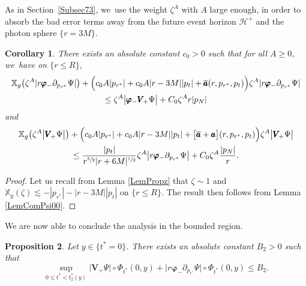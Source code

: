 \documentclass[10pt]{amsart}
\theoremstyle{plain}
\newtheorem{proposition}{Proposition}[section]
\newtheorem{corollary}[proposition]{Corollary}
\theoremstyle{definition}
\newcommand\T{{\mathbb{X}}}
\renewcommand\H{{\mathcal{H}^+}}
\begin{document}
As in Section~\ref{Subsec73}, we~use the weight $\zeta^A$ with $A$ large enough, in order to absorb the bad error terms away from the future event horizon $\H$ and the photon sphere $\{ r=3M \}$.

\begin{corollary}\label{CorComBounded}
There exists an absolute constant $c_0>0$ such that for all $A \geq 0$, we~have on $\{ r \leq R \}$,
\begin{multline*}
\T_g \bigl(\zeta^A| r \pmb{\varphi}_- \partial_{p_{r^*}} \Psi| \bigr) +\Bigl(c_0A |p_{r^*}|+c_0A|r-3M||p_t|+\overline{\pmb{a}}(r,p_{r^*},p_t) \Bigr) \zeta^A|r \pmb{\varphi}_- \partial_{p_{r^*}} \Psi| \\
\leq \zeta^A \big| \pmb{\varphi}_- \pmb{V}_{\! +} \Psi \big|+C_0\zeta^A r|p_N|
\end{multline*}
and
\begin{multline*}
\T_g \bigl(\zeta^A \big| \pmb{V}_{\! +} \Psi \big| \bigr) + \Bigl(c_0A |p_{r^*}|+c_0A|r-3M||p_t|+ \bigl[\overline{\pmb{a}}+\pmb{a} \bigr](r,p_{r^*},p_t)\Bigr) \zeta^A \big| \pmb{V}_{\! +} \Psi \big| \\
\leq \frac{|p_t|}{r^{\sfrac{5}{2}}|r+6M|^{\sfrac{1}{2}}}\zeta^A\big| r \pmb{\varphi}_- \partial_{p_{r^*}}\Psi \big|+C_0\zeta^A\frac{|p_N|}{r}.
\end{multline*}
\end{corollary}

\begin{proof}
Let us recall from Lemma \ref{LemPropz} that $\zeta \sim 1$ and $\T_g(\zeta)\lesssim -|p_{r^*}|-|r-3M||p_t|$ on $\{ r \leq R \}$. The result then follows from Lemma \ref{LemComPsi00}.
\end{proof}

We are now able to conclude the analysis in the bounded region.

\begin{proposition}\label{ProboundedPsi}
Let $y \in \{ t^*=0 \}$. There exists an absolute constant $B_2>0$ such that
\[
\sup_{0 \leq t^* < t^*_2(y)} \big| \pmb{V}_{\! +}\Psi \big|\circ \Phi_{t^*}(0,y)+\big|r \pmb{\varphi}_- \partial_{p_{r^*}} \Psi \big|\circ \Phi_{t^*}(0,y) \leq B_2.
\]
\end{proposition}
\end{document}
